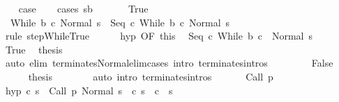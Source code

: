 \begin{isabellebody}
\ \ \isamarkupfalse%
\ {\isacharquery}case\isanewline
\ \ \isamarkupfalse%
\ {\isacharparenleft}cases\ {\isachardoublequoteopen}s{\isasymin}b{\isachardoublequoteclose}{\isacharparenright}\ \isanewline
\ \ \ \ \isamarkupfalse%
\ True\isanewline
\ \ \ \ \isamarkupfalse%
\ \isamarkupfalse%
\ {\isachardoublequoteopen}{\isasymGamma}{\isasymturnstile}\ {\isacharparenleft}While\ b\ c{\isacharcomma}\ Normal\ s{\isacharparenright}\ {\isasymrightarrow}\ {\isacharparenleft}Seq\ c\ {\isacharparenleft}While\ b\ c{\isacharparenright}{\isacharcomma}\ Normal\ s{\isacharparenright}{\isachardoublequoteclose}\isanewline
\ \ \ \ \ \ \isamarkupfalse%
\ {\isacharparenleft}rule\ step{\isachardot}WhileTrue{\isacharparenright}\isanewline
\ \ \ \ \isamarkupfalse%
\ hyp\ {\isacharbrackleft}OF\ this{\isacharbrackright}\ \isamarkupfalse%
\ {\isachardoublequoteopen}{\isasymGamma}{\isasymturnstile}{\isacharparenleft}Seq\ c\ {\isacharparenleft}While\ b\ c{\isacharparenright}{\isacharparenright}\ {\isasymdown}\ Normal\ s{\isachardoublequoteclose}\isacommand{{\isachardot}}\isamarkupfalse%
\isanewline
\ \ \ \ \isamarkupfalse%
\ True\ \isamarkupfalse%
\ {\isacharquery}thesis\isanewline
\ \ \ \ \ \ \isamarkupfalse%
\ {\isacharparenleft}auto\ elim{\isacharcolon}\ terminates{\isacharunderscore}Normal{\isacharunderscore}elim{\isacharunderscore}cases\ intro{\isacharcolon}\ terminates{\isachardot}intros{\isacharparenright}\isanewline
\ \ \isamarkupfalse%
\isanewline
\ \ \ \ \isamarkupfalse%
\ False\isanewline
\ \ \ \ \isamarkupfalse%
\ {\isacharquery}thesis\isanewline
\ \ \ \ \ \ \isamarkupfalse%
\ {\isacharparenleft}auto\ intro{\isacharcolon}\ terminates{\isachardot}intros{\isacharparenright}\isanewline
\ \ \isamarkupfalse%
\isanewline
{}\isamarkupfalse%
\isanewline
\ \ \isamarkupfalse%
\ {\isacharparenleft}Call\ p{\isacharparenright}\isanewline
\ \ \isamarkupfalse%
\ hyp{\isacharcolon}\ {\isachardoublequoteopen}{\isasymAnd}c{\isacharprime}\ s{\isacharprime}{\isachardot}\ {\isasymGamma}{\isasymturnstile}\ {\isacharparenleft}Call\ p{\isacharcomma}\ Normal\ s{\isacharparenright}\ {\isasymrightarrow}\ {\isacharparenleft}c{\isacharprime}{\isacharcomma}\ s{\isacharprime}{\isacharparenright}\ {\isasymLongrightarrow}\ {\isasymGamma}{\isasymturnstile}c{\isacharprime}\ {\isasymdown}\ s{\isacharprime}{\isachardoublequoteclose}\ \isamarkupfalse%

\end{isabellebody}

